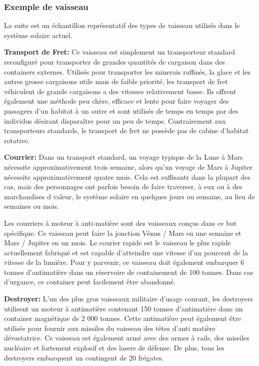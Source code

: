 \subsubsection{Exemple de vaisseau} 

La suite est un échantillon représentatif des types de vaisseau utilisés dans le système solaire actuel. 

\textbf{Transport de Fret:} Ce vaisseau est simplement un transporteur standard reconfiguré pour transporter de grandes quantités de cargaison dans des containers externes. Utilisés pour transporter les minerais raffinés, la glace et les autres grosse cargaisons utile mais de faible priorité, les transport de fret véhiculent de grande cargaisons a des vitesses relativement basse. Ils offrent également une méthode peu chère, efficace et lente pour faire voyager des passagers d'un habitat à un autre et sont utilisés de temps en temps par des individus désirant disparaître pour un peu de temps. Contrairement aux transporteurs standards, le transport de fret ne possède pas de cabine d'habitat rotative. 

\textbf{Courrier:} Dans un transport standard, un voyage typique de la Lune à Mars nécessite approximativement trois semaine, alors qu'un voyage de Mars à Jupiter nécessite approximativement quatre mois. Cela est suffisantr dans la plupart des cas, mais des personnages ont parfois besoin de faire traverser, à eux ou à des marchandises d valeur, le système solaire en quelques jours ou semaine, au lieu de semaines ou mois. 

Les courriers à moteur à anti-matière sont des vaisseaux conçus dans ce but spécifique. Ce vaisseau peut faire la jonction Vénus / Mars en une semaine et Mars / Jupiter en un mois. Le courier rapide est le vaisseau le plus rapide actuellement fabriqué et est capable d'atteindre une vitesse d'un pourcent de la vitesse de la lumière. Pour y parvenir, ce vaisseau doit également embarquer 6 tonnes d'antimatière dans un réservoire de containement de 100 tonnes. Dans cas d'urgance, ce container peut facilement être abandonné. 

\textbf{Destroyer:} L'un des plus gros vaisseaux militaire d'usage courant, les destroyers utilisent un moteur à antimatière contenant 150 tonnes d'antimatière dans un container magnétique de 2 000 tonnes. Cette antimatière peut également être utilisée pour fournir aux missiles du vaisseau des têtes d'anti matière dévastatrice. Ce vaisseau est également armé avec des armes à rails, des missiles nucléaire et fortement explosif et des lasers de défense. De plus, tous les destroyers embarquent un contingent de 20 frégates. 

